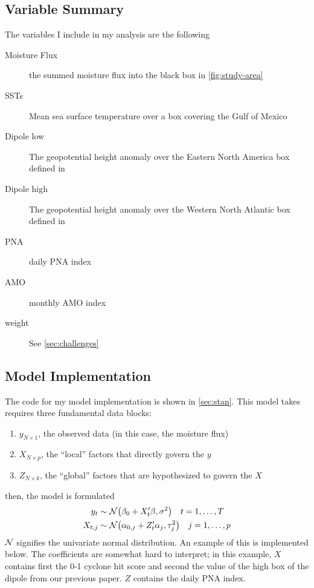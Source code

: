 \documentclass[12pt]{article}
\begin{document}
\subsection{Variable Summary}

The variables I include in my analysis are the following
\begin{description}
    \item[Moisture Flux] the summed moisture flux into the black box in \cref{fig:study-area}
    \item[SSTs] Mean sea surface temperature over a box covering the Gulf of Mexico
    \item[Dipole low] The geopotential height anomaly over the Eastern North America box defined in \citet{Farnham2016}
    \item[Dipole high] The geopotential height anomaly over the Western North Atlantic box defined in \citet{Farnham2016}
    \item[PNA] daily PNA index
    \item[AMO] monthly AMO index
    \item[weight] See \cref{sec:challenges}
\end{description}

\subsection{Model Implementation}

The \stan code for my model implementation is shown in \cref{sec:stan}.
This model takes requires three fundamental data blocks:
\begin{enumerate}
    \item $y_{N \times 1}$, the observed data (in this case, the moisture flux)
    \item $X_{N \times p}$, the ``local'' factors that directly govern the $y$
    \item $Z_{N \times k}$, the ``global'' factors that are hypothesized to govern the $X$
\end{enumerate}
then, the model is formulated
\begin{align}
    y_t & \sim \mathcal{N} \qty(\beta_0 + X'_t \beta, \sigma^2) \quad t = 1, \ldots, T \label{eq:yX}\\
    X_{t,j} &\sim \mathcal{N} \qty(\alpha_{0,j} + Z'_t \alpha_j, \tau_j^2) \quad j = 1, \ldots, p \label{eq:XZ}
\end{align}
$\mathcal{N}$ signifies the univariate normal distribution.
An example of this is implemented below.
The coefficients are somewhat hard to interpret; in this example, $X$ contains first the 0-1 cyclone hit score and second the value of the high box of the dipole from our previous paper.
$Z$ contains the daily PNA index.
\end{document}
